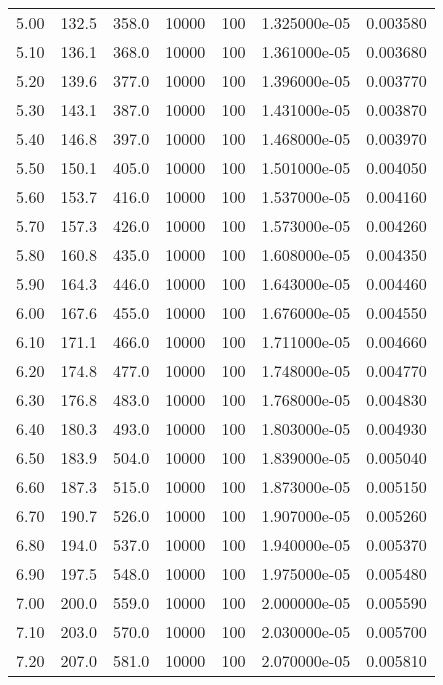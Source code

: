 \begin{tabular}{rrrrrrr}
    5.00 &     132.5 &     358.0 & 10000 &  100 & 1.325000e-05 & 0.003580 \\
    5.10 &     136.1 &     368.0 & 10000 &  100 & 1.361000e-05 & 0.003680 \\
    5.20 &     139.6 &     377.0 & 10000 &  100 & 1.396000e-05 & 0.003770 \\
    5.30 &     143.1 &     387.0 & 10000 &  100 & 1.431000e-05 & 0.003870 \\
    5.40 &     146.8 &     397.0 & 10000 &  100 & 1.468000e-05 & 0.003970 \\
    5.50 &     150.1 &     405.0 & 10000 &  100 & 1.501000e-05 & 0.004050 \\
    5.60 &     153.7 &     416.0 & 10000 &  100 & 1.537000e-05 & 0.004160 \\
    5.70 &     157.3 &     426.0 & 10000 &  100 & 1.573000e-05 & 0.004260 \\
    5.80 &     160.8 &     435.0 & 10000 &  100 & 1.608000e-05 & 0.004350 \\
    5.90 &     164.3 &     446.0 & 10000 &  100 & 1.643000e-05 & 0.004460 \\
    6.00 &     167.6 &     455.0 & 10000 &  100 & 1.676000e-05 & 0.004550 \\
    6.10 &     171.1 &     466.0 & 10000 &  100 & 1.711000e-05 & 0.004660 \\
    6.20 &     174.8 &     477.0 & 10000 &  100 & 1.748000e-05 & 0.004770 \\
    6.30 &     176.8 &     483.0 & 10000 &  100 & 1.768000e-05 & 0.004830 \\
    6.40 &     180.3 &     493.0 & 10000 &  100 & 1.803000e-05 & 0.004930 \\
    6.50 &     183.9 &     504.0 & 10000 &  100 & 1.839000e-05 & 0.005040 \\
    6.60 &     187.3 &     515.0 & 10000 &  100 & 1.873000e-05 & 0.005150 \\
    6.70 &     190.7 &     526.0 & 10000 &  100 & 1.907000e-05 & 0.005260 \\
    6.80 &     194.0 &     537.0 & 10000 &  100 & 1.940000e-05 & 0.005370 \\
    6.90 &     197.5 &     548.0 & 10000 &  100 & 1.975000e-05 & 0.005480 \\
    7.00 &     200.0 &     559.0 & 10000 &  100 & 2.000000e-05 & 0.005590 \\
    7.10 &     203.0 &     570.0 & 10000 &  100 & 2.030000e-05 & 0.005700 \\
    7.20 &     207.0 &     581.0 & 10000 &  100 & 2.070000e-05 & 0.005810 \\

\end{tabular}
